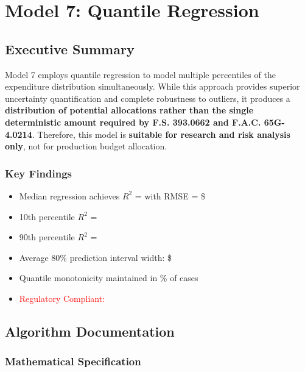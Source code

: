 \chapter{Model 7: Quantile Regression}\label{ch:model7}



\section{Executive Summary}

Model 7 employs quantile regression to model multiple percentiles of the expenditure distribution simultaneously. While this approach provides superior uncertainty quantification and complete robustness to outliers, it produces a \textbf{distribution of potential allocations rather than the single deterministic amount required by F.S. 393.0662 and F.A.C. 65G-4.0214}. Therefore, this model is \textbf{suitable for research and risk analysis only}, not for production budget allocation.

\subsection{Key Findings}
\begin{itemize}
    \item Median regression achieves $R^2$ = \ModelSevenRSquaredTest{} with RMSE = \$\ModelSevenRMSETest{}
    \item 10th percentile $R^2$ = \ModelSevenQuantileTenRSquared{}
    \item 90th percentile $R^2$ = \ModelSevenQuantileNinetyRSquared{}
    \item Average 80\% prediction interval width: \$\ModelSevenPredictionIntervalWidth{}
    \item Quantile monotonicity maintained in \ModelSevenQuantileMonotonicity{}\% of cases
    \item \textcolor{red}{Regulatory Compliant: \ModelSevenRegulatoryCompliant{}}
\end{itemize}

\section{Algorithm Documentation}

\subsection{Mathematical Specification}

